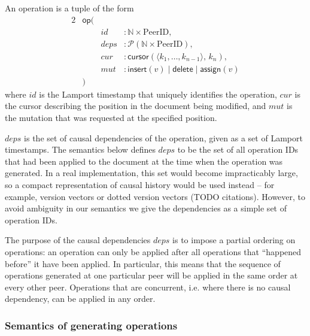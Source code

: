 \documentclass[a4paper,twocolumn,10pt]{article}
\begin{document}
An operation is a tuple of the form
\begin{alignat*}{2}
& \mathsf{op}( \\
&& \mathit{id} &: \mathbb{N} \times \mathrm{PeerID}, \\
&& \mathit{deps} &: \mathcal{P}(\mathbb{N} \times \mathrm{PeerID}), \\
&& \mathit{cur} &: \mathsf{cursor}(\langle k_1, \dots, k_{n-1} \rangle,\, k_n), \\
&& \mathit{mut} &: \mathsf{insert}(v) \mid \mathsf{delete} \mid \mathsf{assign}(v) \\
& )
\end{alignat*}
where $\mathit{id}$ is the Lamport timestamp that uniquely identifies the operation, $\mathit{cur}$ is the cursor describing the position in the document being modified, and $\mathit{mut}$ is the mutation that was requested at the specified position.

$\mathit{deps}$ is the set of causal dependencies of the operation, given as a set of Lamport timestamps. The semantics below defines $\mathit{deps}$ to be the set of all operation IDs that had been applied to the document at the time when the operation was generated. In a real implementation, this set would become impracticably large, so a compact representation of causal history would be used instead -- for example, version vectors or dotted version vectors (TODO citations). However, to avoid ambiguity in our semantics we give the dependencies as a simple set of operation IDs.

The purpose of the causal dependencies $\mathit{deps}$ is to impose a partial ordering on operations: an operation can only be applied after all operations that ``happened before'' it have been applied. In particular, this means that the sequence of operations generated at one particular peer will be applied in the same order at every other peer. Operations that are concurrent, i.e. where there is no causal dependency, can be applied in any order.

\subsubsection{Semantics of generating operations}
\end{document}
